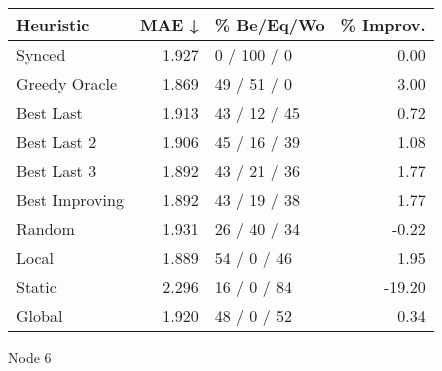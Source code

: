 \begin{tabular}{lrlr}
\toprule
\textbf{Heuristic} & \textbf{MAE ↓} & \textbf{\% Be/Eq/Wo} & \textbf{\% Improv.} \\
\midrule
            Synced &          1.927 &          0 / 100 / 0 &                0.00 \\
     Greedy Oracle &          1.869 &          49 / 51 / 0 &                3.00 \\
         Best Last &          1.913 &         43 / 12 / 45 &                0.72 \\
       Best Last 2 &          1.906 &         45 / 16 / 39 &                1.08 \\
       Best Last 3 &          1.892 &         43 / 21 / 36 &                1.77 \\
    Best Improving &          1.892 &         43 / 19 / 38 &                1.77 \\
            Random &          1.931 &         26 / 40 / 34 &               -0.22 \\
             Local &          1.889 &          54 / 0 / 46 &                1.95 \\
            Static &          2.296 &          16 / 0 / 84 &              -19.20 \\
            Global &          1.920 &          48 / 0 / 52 &                0.34 \\
\bottomrule
\end{tabular}
\caption{Node 6}
\label{tab:ds_non_lr05_le1_bs4_6}

